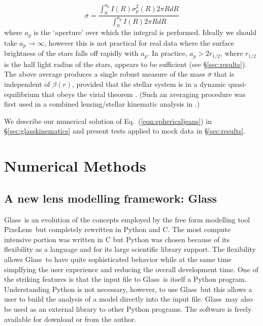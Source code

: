 \documentclass[galley,usenatbib]{mn2e}
\newcommand{\Glass}{{\sc Glass}}
\newcommand{\PixeLens}{{\sc PixeLens}}
\newcommand{\eqnref}[1] {Eq.~(\ref{#1})}
\begin{document}
\begin{equation}
\overline{\sigma} = \frac{\int_0^{a_p} I(R) \sigma_p^2(R) 2\pi R dR}{\int_0^{a_p} I(R) 2\pi R dR}
\label{eqn:virialaverage}
\end{equation} 
where $a_p$ is the `aperture' over which the integral is performed. Ideally we should take $a_p \rightarrow \infty$, however this is not practical for real data where the surface brightness of the stars falls off rapidly with $a_p$. In practice, $a_p > 2r_{1/2}$, where $r_{1/2}$ is the half light radius of the stars, appears to be sufficient (see \S\ref{sec:results}). The above average produces a single robust measure of the mass $\overline{\sigma}$ that is independent of $\beta(r)$, provided that the stellar system is in a dynamic quasi-equilibrium that obeys the virial theorem \citep{2009ApJ...704.1274W,2010MNRAS.406.1220W,2012ApJ...754L..39A}. (Such an averaging procedure was first used in a combined lensing/stellar kinematic analysis in \citealt{2002MNRAS.337L...6T}.)

We describe our numerical solution of \eqnref{eqn:sphericaljeans} in \S\ref{sec:glasskinematics} and present tests applied to mock data in \S\ref{sec:results}. 

\section{Numerical Methods}\label{sec:glass}

\subsection{A new lens modelling framework: \Glass}

\Glass\ is an evolution of the concepts employed by the free form modelling tool
\PixeLens\ but completely rewritten in Python and C. 
The most compute intensive
portion was written in C but Python was chosen because of its flexibility as a 
language and for its large scientific library support. The flexibility allows 
\Glass\ to have quite sophisticated behavior while at the same time simplfying the 
user experience and reducing the overall development time. One of the striking
features is that the input file to \Glass\ is itself a Python program.
Understanding Python is not necessary, however, to use \Glass\ but this allows
a user to build the analysis of a model directly into the input file. \Glass\
may also be used as an external library to other Python programs.  The software
is freely available for download or from the author. 
\end{document}
